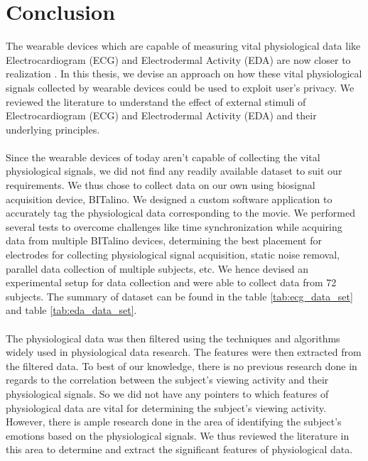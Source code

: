 
\section{Conclusion}
The wearable devices which are capable of measuring vital physiological data like Electrocardiogram (ECG) and Electrodermal Activity (EDA) are now closer to realization \cite{haghi_wearable_2017}. In this thesis, we devise an approach on how these vital physiological signals collected by wearable devices could be used to exploit user's privacy. We reviewed the literature to understand the effect of external stimuli of Electrocardiogram (ECG) and Electrodermal Activity (EDA) and their underlying principles.

\paragraph{} Since the wearable devices of today aren't capable of collecting the vital physiological signals, we did not find any readily available dataset to suit our requirements. We thus chose to collect data on our own using biosignal acquisition device, BITalino. We designed a custom software application to accurately tag the physiological data corresponding to the movie. We performed several tests to overcome challenges like time synchronization while acquiring data from multiple BITalino devices, determining the best placement for electrodes for collecting physiological signal acquisition, static noise removal, parallel data collection of multiple subjects, etc. We hence devised an experimental setup for data collection and were able to collect data from 72 subjects. The summary of dataset can be found in the table \ref{tab:ecg_data_set} and table \ref{tab:eda_data_set}.

\paragraph{} The physiological data was then filtered using the techniques and algorithms widely used in physiological data research. The features were then extracted from the filtered data. To best of our knowledge, there is no previous research done in regards to the correlation between the subject's viewing activity and their physiological signals. So we did not have any pointers to which features of physiological data are vital for determining the subject's viewing activity. However, there is ample research done in the area of identifying the subject's emotions based on the physiological signals. We thus reviewed the literature in this area to determine and extract the significant features of physiological data.
